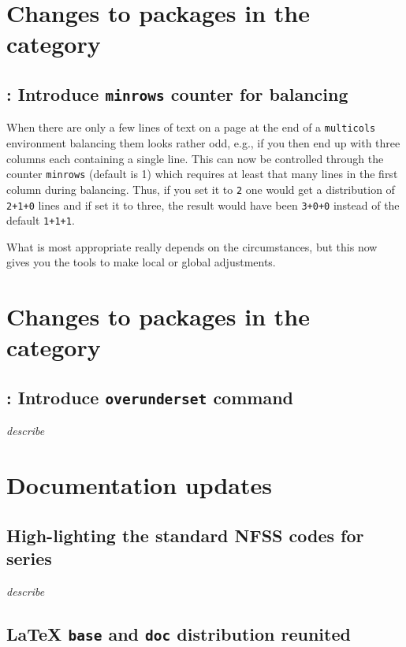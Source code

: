\documentclass{ltnews}
\providecommand\env[1]{\texttt{#1}}
\begin{document}
        
\section{Changes to packages in the  category}

\subsection{: Introduce \texttt{minrows} counter for balancing}

When there are only a few lines of text on a page at the end of a
\env{multicols} environment balancing them looks rather odd, e.g., if
you then end up with three columns each containing a single line. This
can now be controlled through the counter \texttt{minrows} (default is
1) which requires at least that many lines in the first column during
balancing. Thus, if you set it to \texttt{2} one would get a
distribution of \texttt{2+1+0} lines and if set it to three, the result
would have been \texttt{3+0+0} instead of the default \texttt{1+1+1}.

What is most appropriate really depends on the circumstances, but this
now gives you the tools to make local or global adjustments.


        
\section{Changes to packages in the  category}

\subsection{: Introduce \texttt{overunderset} command}

\emph{describe}



\section{Documentation updates}

\subsection{High-lighting the standard NFSS codes for series}

\emph{describe}


\subsection{\LaTeX{} \texttt{base} and \texttt{doc} distribution reunited}
      
\end{document}
